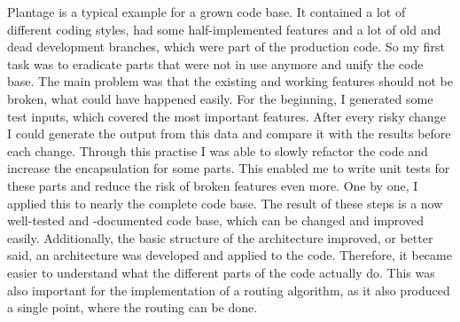 Plantage is a typical example for a grown code base. It contained a lot of different coding styles, had some half-implemented features and a lot of old and dead development branches, which were part of the production code. So my first task was to eradicate parts that were not in use anymore and unify the code base. The main problem was that the existing and working features should not be broken, what could have happened easily. For the beginning, I generated some test inputs, which covered the most important features. After every risky change I could generate the output from this data and compare it with the results before each change. Through this practise I was able to slowly refactor the code and increase the encapsulation for some parts. This enabled me to write unit tests for these parts and reduce the risk of broken features even more. One by one, I applied this to nearly the complete code base. The result of these steps is a now well-tested and -documented code base, which can be changed and improved easily. Additionally, the basic structure of the architecture improved, or better said, an architecture was developed and applied to the code. Therefore, it became easier to understand what the different parts of the code actually do. This was also important for the implementation of a routing algorithm, as it also produced a single point, where the routing can be done.